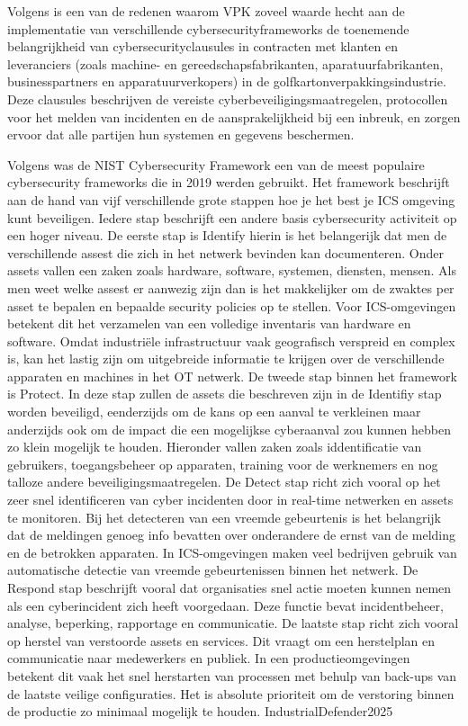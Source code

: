 Volgens \textcite{fefco2025} is een van de redenen waarom VPK zoveel waarde hecht aan de implementatie van verschillende cybersecurityframeworks de toenemende belangrijkheid van cybersecurityclausules in contracten met klanten en leveranciers (zoals machine- en gereedschapsfabrikanten, aparatuurfabrikanten, businesspartners en apparatuurverkopers) in de golfkartonverpakkingsindustrie. Deze clausules beschrijven de vereiste cyberbeveiligingsmaatregelen, protocollen voor het melden van incidenten en de aansprakelijkheid bij een inbreuk, en zorgen ervoor dat alle partijen hun systemen en gegevens beschermen.

Volgens \textcite{IndustrialDefender2025} was de NIST Cybersecurity Framework een van de meest populaire cybersecurity frameworks die in 2019 werden gebruikt. Het framework beschrijft aan de hand van vijf verschillende grote stappen hoe je het best je ICS omgeving kunt beveiligen. Iedere stap beschrijft een andere basis cybersecurity activiteit op een hoger niveau.
De eerste stap is Identify hierin is het belangerijk dat men de verschillende assest die zich in het netwerk bevinden kan documenteren. Onder assets vallen een zaken zoals hardware, software, systemen, diensten, mensen. Als men weet welke assest er aanwezig zijn dan is het makkelijker om de zwaktes per asset te bepalen en bepaalde security policies op te stellen. Voor ICS-omgevingen betekent dit het verzamelen van een volledige inventaris van hardware en software. Omdat industriële infrastructuur vaak geografisch verspreid en complex is, kan het lastig zijn om uitgebreide informatie te krijgen over de verschillende apparaten en machines in het OT netwerk. \autocite{Nist2024}
De tweede stap binnen het framework is Protect. In deze stap zullen de assets die beschreven zijn in de Identifiy stap worden beveiligd, eenderzijds om de kans op een aanval te verkleinen maar anderzijds ook om de impact die een mogelijkse cyberaanval zou kunnen hebben zo klein mogelijk te houden. Hieronder vallen zaken zoals iddentificatie van gebruikers, toegangsbeheer op apparaten, training voor de werknemers en nog talloze andere beveiligingsmaatregelen. \autocite{Nist2024}
De Detect stap richt zich vooral op het zeer snel identificeren van cyber incidenten door in real-time netwerken en assets te monitoren. Bij het detecteren van een vreemde gebeurtenis is het belangrijk dat de meldingen genoeg info bevatten over onderandere de ernst van de melding en de betrokken apparaten. In ICS-omgevingen maken veel bedrijven gebruik van automatische detectie van vreemde gebeurtenissen binnen het netwerk. \autocite{Nist2024}
De Respond stap beschrijft vooral dat organisaties snel actie moeten kunnen nemen als een cyberincident zich heeft voorgedaan. Deze functie bevat incidentbeheer, analyse, beperking, rapportage en communicatie. \autocite{Nist2024}
De laatste stap richt zich vooral op herstel van verstoorde assets en services. Dit vraagt om een herstelplan en communicatie naar medewerkers en publiek. In een productieomgevingen betekent dit vaak het snel herstarten van processen met behulp van back-ups van de laatste veilige configuraties. Het is absolute prioriteit om de verstoring binnen de productie zo minimaal mogelijk te houden. {IndustrialDefender2025}



